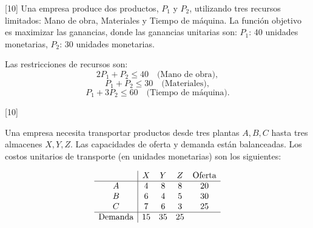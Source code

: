 \documentclass[11pt,paper=a4,answers, addpoints]{exam}
\begin{document}
\begin{questions}

[10]
Una empresa produce dos productos, \(P_1\) y \(P_2\), utilizando tres recursos limitados: Mano de obra, Materiales y Tiempo de máquina. La función objetivo es maximizar las ganancias, donde las ganancias unitarias son: $P_1$: 40 unidades monetarias, $P_2$: 30 unidades monetarias.

Las restricciones de recursos son:
\[
2P_1 + P_2 \leq 40 \quad \text{(Mano de obra)},
\]
\[
P_1 + P_2 \leq 30 \quad \text{(Materiales)},
\]
\[
P_1 + 3P_2 \leq 60 \quad \text{(Tiempo de máquina)}.
\]


[10]

Una empresa necesita transportar productos desde tres plantas \(A, B, C\) hasta tres almacenes \(X, Y, Z\). Las capacidades de oferta y demanda están balanceadas. Los costos unitarios de transporte (en unidades monetarias) son los siguientes:

\[
\begin{array}{c|c c c c}
 & X & Y & Z & \text{Oferta} \\
\hline
A & 4 & 8 & 8 & 20 \\
B & 6 & 4 & 5 & 30 \\
C & 7 & 6 & 3 & 25 \\
\hline
\text{Demanda} & 15 & 35 & 25 &
\end{array}
\]



\end{questions}
\end{document}
